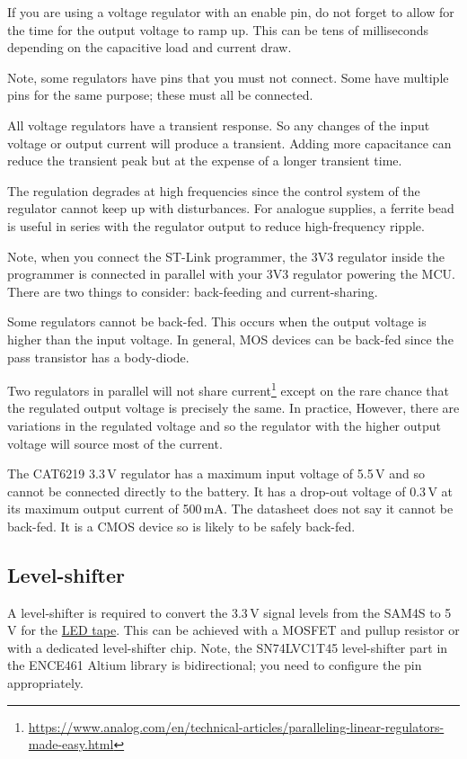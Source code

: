If you are using a voltage regulator with an enable pin, do not forget
to allow for the time for the output voltage to ramp up. This can be
tens of milliseconds depending on the capacitive load and current draw.

Note, some regulators have pins that you must not connect. Some have
multiple pins for the same purpose; these must all be connected.

All voltage regulators have a transient response.  So any changes of
the input voltage or output current will produce a transient.  Adding
more capacitance can reduce the transient peak but at the expense of a
longer transient time.

The regulation degrades at high frequencies since the control system
of the regulator cannot keep up with disturbances.  For analogue
supplies, a ferrite bead is useful in series with the regulator output
to reduce high-frequency ripple.


Note, when you connect the ST-Link programmer, the 3V3 regulator
inside the programmer is connected in parallel with your 3V3 regulator
powering the MCU.  There are two things to consider: back-feeding and
current-sharing.

Some regulators cannot be back-fed.  This occurs when the output
voltage is higher than the input voltage.  In general, MOS devices can
be back-fed since the pass transistor has a body-diode.

Two regulators in parallel will not share
current\footnote{\url{https://www.analog.com/en/technical-articles/paralleling-linear-regulators-made-easy.html}}
except on the rare chance that the regulated output voltage is
precisely the same.  In practice, However, there are variations in the
regulated voltage and so the regulator with the higher output voltage
will source most of the current.

The CAT6219 3.3\,V regulator has a maximum input voltage of 5.5\,V and
so cannot be connected directly to the battery.  It has a drop-out
voltage of 0.3\,V at its maximum output current of 500\,mA.  The
datasheet does not say it cannot be back-fed.  It is a CMOS device so
is likely to be safely back-fed.


\subsection{Level-shifter}\label{level-shifter}

A level-shifter is required to convert the 3.3\,V signal levels from
the SAM4S to 5\,V for the \hyperref[LED-tape]{LED tape}.  This can be
achieved with a MOSFET and pullup resistor or with a dedicated
level-shifter chip.  Note, the SN74LVC1T45 level-shifter part in the
ENCE461 Altium library is bidirectional; you need to configure the
 pin appropriately.



